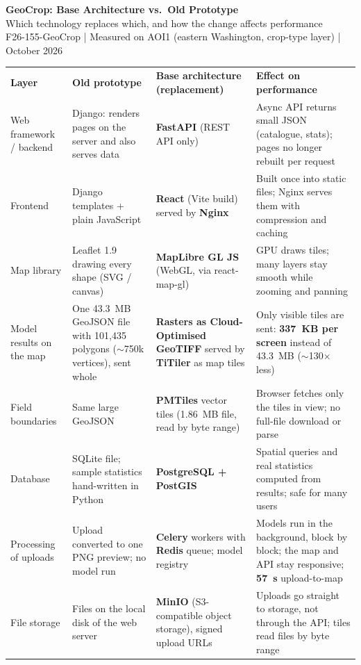 \documentclass[10pt]{article}
\begin{document}
{\LARGE\bfseries GeoCrop: Base Architecture vs.\ Old Prototype}\\[3pt]
{\large Which technology replaces which, and how the change affects performance}\\[2pt]
{\small F26-155-GeoCrop \;|\; Measured on AOI1 (eastern Washington, crop-type layer) \;|\; October 2026}

\vspace{8pt}
\small
{}
\begin{tabularx}{\textwidth}{L{2.6cm} L{4.6cm} L{4.6cm} Y}
\color{white}\bfseries Layer &
\color{white}\bfseries Old prototype &
\color{white}\bfseries Base architecture (replacement) &
\color{white}\bfseries Effect on performance\\
Web framework / backend & Django: renders pages on the server and also serves data & \textbf{FastAPI} (REST API only) & Async API returns small JSON (catalogue, stats); pages no longer rebuilt per request\\
Frontend & Django templates + plain JavaScript & \textbf{React} (Vite build) served by \textbf{Nginx} & Built once into static files; Nginx serves them with compression and caching\\
Map library & Leaflet 1.9 drawing every shape (SVG / canvas) & \textbf{MapLibre GL JS} (WebGL, via react-map-gl) & GPU draws tiles; many layers stay smooth while zooming and panning\\
Model results on the map & One 43.3~MB GeoJSON file with 101,435 polygons ($\sim$750k vertices), sent whole & \textbf{Rasters as Cloud-Optimised GeoTIFF} served by \textbf{TiTiler} as map tiles & Only visible tiles are sent: \textbf{337~KB per screen} instead of 43.3~MB ($\sim$130$\times$ less)\\
Field boundaries & Same large GeoJSON & \textbf{PMTiles} vector tiles (1.86~MB file, read by byte range) & Browser fetches only the tiles in view; no full-file download or parse\\
Database & SQLite file; sample statistics hand-written in Python & \textbf{PostgreSQL + PostGIS} & Spatial queries and real statistics computed from results; safe for many users\\
Processing of uploads & Upload converted to one PNG preview; no model run & \textbf{Celery} workers with \textbf{Redis} queue; model registry & Models run in the background, block by block; the map and API stay responsive; \textbf{57~s} upload-to-map\\
File storage & Files on the local disk of the web server & \textbf{MinIO} (S3-compatible object storage), signed upload URLs & Uploads go straight to storage, not through the API; tiles read files by byte range\\

\end{tabularx}
\end{document}
